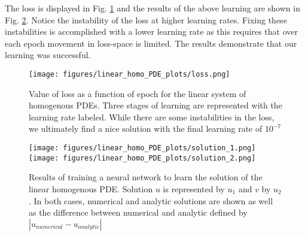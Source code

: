 \documentclass{CUP-JNL-DTM}%
\theoremstyle{definition}
\numberwithin{equation}{section}
\begin{document}

The loss is displayed in Fig. \ref{fig:loss_linear} and the results of the above learning are shown in Fig. \ref{fig:results_linear}. Notice the instability of the loss at higher learning rates. Fixing these instabilities is accomplished with a lower learning rate as this requires that over each epoch movement in loss-space is limited. The results demonstrate that our learning was successful. 

\begin{figure}
\centering
	\texttt{[image: figures/linear\_homo\_PDE\_plots/loss.png]}
	\caption{Value of loss as a function of epoch for the linear system of homogenous PDEs. Three stages of learning are represented with the learning rate labeled. While there are some instabilities in the loss, we ultimately find a nice solution with the final learning rate of $10^{-7}$}
	\label{fig:loss_linear}
\end{figure}

\begin{figure}
\centering
	\texttt{[image: figures/linear\_homo\_PDE\_plots/solution\_1.png]}
	\texttt{[image: figures/linear\_homo\_PDE\_plots/solution\_2.png]}
	\caption{Results of training a neural network to learn the solution of the linear homogenous PDE. Solution $u$ is represented by $u_1$ and $v$ by $u_2$. In both cases, numerical and analytic solutions are shown as well as the difference between numerical and analytic defined by $|u_{numerical} - u_{analytic}|$}
	\label{fig:results_linear}
\end{figure}
\end{document}
